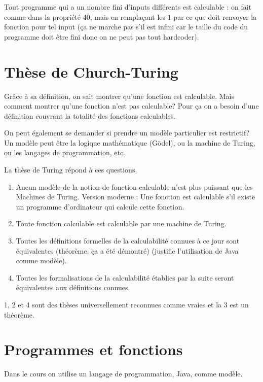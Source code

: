 \begin{myprop}
  Tout programme qui a un nombre fini d'inputs différents est calculable : on fait comme dans la propriété 40, mais en remplaçant les $1$ par ce que doit renvoyer la fonction pour tel input (ça ne marche pas s'il est infini car le taille du code du programme doit être fini donc on ne peut pas tout hardcoder).
\end{myprop}


\section{Thèse de Church-Turing}
\label{sec:th_se_de_church_turing}
Grâce à sa définition, on sait montrer qu'une fonction est calculable. Mais comment
montrer qu'une fonction n'est pas calculable? Pour ça on a besoin d'une définition
couvrant la totalité des fonctions calculables.

On peut également se demander si prendre un modèle particulier est restrictif? Un modèle peut être la logique mathématique (Gödel), ou la machine de Turing, ou les langages de programmation, etc.

La thèse de Turing répond à ces questions.
\begin{enumerate}
	\item Aucun modèle de la notion de fonction calculable n'est plus puissant que les Machines de Turing.
		Version moderne : Une fonction est calculable s'il existe un programme d'ordinateur qui calcule cette fonction.
	\item Toute fonction calculable est calculable par une machine de Turing.
	\item Toutes les définitions formelles de la calculabilité connues à ce jour sont équivalentes (théorème, ça a été démontré) (justifie l'utilisation de Java comme modèle).
	\item Toutes les formalisations de la calculabilité établies par la
		suite seront équivalentes aux définitions connues.
\end{enumerate}
1, 2 et 4 sont des thèses universellement reconnues comme vraies et la 3 est un théorème.


\section{Programmes et fonctions}
\label{sec:programmes_et_fonctions}
Dans le cours on utilise un langage de programmation, Java, comme modèle.

